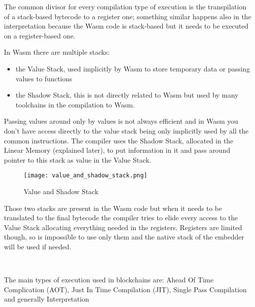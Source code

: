 \documentclass[../main.tex]{subfiles}
\begin{document}
The common divisor for every compilation type of execution is the transpilation of a stack-based bytecode to a register one; something similar happens also in the interpretation because the Wasm code is stack-based but it needs to be executed on a register-based one.

In Wasm there are multiple stacks:
\begin{itemize}
  \item the Value Stack, used implicitly by Wasm to store temporary data or passing values to functions
  \item  the Shadow Stack, this is not directly related to Wasm but used by many toolchains in the compilation to Wasm.
\end{itemize}

Passing values around only by values is not always efficient and in Wasm you don't have access directly to the value stack being only implicitly used by all the common instructions. The compiler uses the Shadow Stack, allocated in the Linear Memory (explained later), to put information in it and pass around pointer to this stack as value in the Value Stack.

\begin{figure}[h]
  \centering
  \texttt{[image: value\_and\_shadow\_stack.png]}
  \caption{Value and Shadow Stack}
  \label{fig:value-shadow-stack}
\end{figure}

Those two stacks are present in the Wasm code but when it needs to be translated to the final bytecode the compiler tries to elide every access to the Value Stack allocating everything needed in the registers. Registers are limited though, so is impossible to use only them and the native stack of the embedder will be used if needed.

\

The main types of execution used in blockchains are: Ahead Of Time Complication (AOT), Just In Time Compilation (JIT), Single Pass Compilation and generally Interpretation
\end{document}
